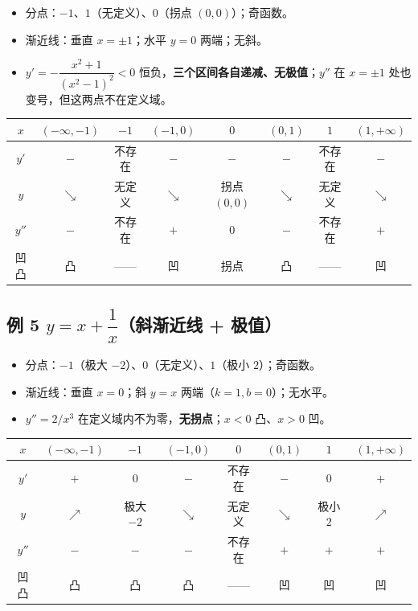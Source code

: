 \documentclass[11pt,a4paper]{ctexart}
\begin{document}
\begin{itemize}[label=$\bullet$,leftmargin=1.5em]
\item 分点：$-1$、$1$（无定义）、$0$（拐点 $(0,0)$）；奇函数。
\item 渐近线：垂直 $x=\pm1$；水平 $y=0$ 两端；无斜。
\item $y'=-\dfrac{x^2+1}{(x^2-1)^2}<0$ 恒负，\textbf{三个区间各自递减、无极值}；$y''$ 在 $x=\pm1$ 处也变号，但这两点不在定义域。
\end{itemize}

\begin{center}
\footnotesize\setlength{\tabcolsep}{1.5pt}
\begin{tabular}{@{}c|ccccccc@{}}
$x$ & $(-\infty,-1)$ & $-1$ & $(-1,0)$ & $0$ & $(0,1)$ & $1$ & $(1,+\infty)$ \\
\hline
$y'$ & $-$ & 不存在 & $-$ & $-$ & $-$ & 不存在 & $-$ \\
$y$ & $\searrow$ & 无定义 & $\searrow$ & 拐点 $(0,0)$ & $\searrow$ & 无定义 & $\searrow$ \\
$y''$ & $-$ & 不存在 & $+$ & $0$ & $-$ & 不存在 & $+$ \\
凹凸 & 凸 & —— & 凹 & 拐点 & 凸 & —— & 凹 \\
\end{tabular}
\end{center}

\subsection{例 5 $y=x+\dfrac1x$（斜渐近线 + 极值）}

\begin{itemize}[label=$\bullet$,leftmargin=1.5em]
\item 分点：$-1$（极大 $-2$）、$0$（无定义）、$1$（极小 $2$）；奇函数。
\item 渐近线：垂直 $x=0$；斜 $y=x$ 两端（$k=1,b=0$）；无水平。
\item $y''=2/x^3$ 在定义域内不为零，\textbf{无拐点}；$x<0$ 凸、$x>0$ 凹。
\end{itemize}

\begin{center}
\footnotesize\setlength{\tabcolsep}{1.5pt}
\begin{tabular}{@{}c|ccccccc@{}}
$x$ & $(-\infty,-1)$ & $-1$ & $(-1,0)$ & $0$ & $(0,1)$ & $1$ & $(1,+\infty)$ \\
\hline
$y'$ & $+$ & $0$ & $-$ & 不存在 & $-$ & $0$ & $+$ \\
$y$ & $\nearrow$ & 极大 $-2$ & $\searrow$ & 无定义 & $\searrow$ & 极小 $2$ & $\nearrow$ \\
$y''$ & $-$ & $-$ & $-$ & 不存在 & $+$ & $+$ & $+$ \\
凹凸 & 凸 & 凸 & 凸 & —— & 凹 & 凹 & 凹 \\
\end{tabular}
\end{center}
\end{document}
